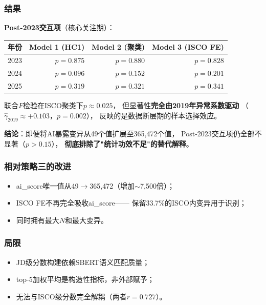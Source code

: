\documentclass[12pt,a4paper]{ctexart}
\begin{document}
\subsubsection{结果}

\begin{resultbox}[策略四：结果]
\textbf{Post-2023交互项}（核心关注期）：

\begin{center}
\small
\begin{tabular}{l rrr}
\toprule
年份 & Model 1 (HC1) & Model 2 (聚类) & Model 3 (ISCO FE) \\
\midrule
2023 & $p=0.875$ & $p=0.880$ & $p=0.828$ \\
2024 & $p=0.096$ & $p=0.152$ & $p=0.201$ \\
2025 & $p=0.319$ & $p=0.321$ & $p=0.341$ \\
\bottomrule
\end{tabular}
\end{center}

联合$F$检验在ISCO聚类下$p\approx 0.025$，
但显著性\textbf{完全由2019年异常系数驱动}
（$\hat{\gamma}_{2019}\approx +0.103$，$p=0.002$），
反映的是数据断层期的样本选择效应。

\textbf{结论}：即便将AI暴露变异从49个值扩展至365,472个值，
Post-2023交互项仍全部不显著（$p>0.15$），
\textbf{彻底排除了"统计功效不足"的替代解释}。
\end{resultbox}

\subsubsection{相对策略三的改进}

\begin{itemize}
\item ai\_score唯一值从49$\to$365,472（增加$\sim$7,500倍）；
\item ISCO FE不再完全吸收ai\_score——
      保留33.7\%的ISCO内变异用于识别；
\item 同时拥有最大$N$和最大变异。
\end{itemize}

\subsubsection{局限}

\begin{itemize}
\item JD级分数构建依赖SBERT语义匹配质量；
\item top-5加权平均是构造性指标，非外部赋予；
\item 无法与ISCO级分数完全解耦（两者$r=0.727$）。
\end{itemize}
\end{document}
